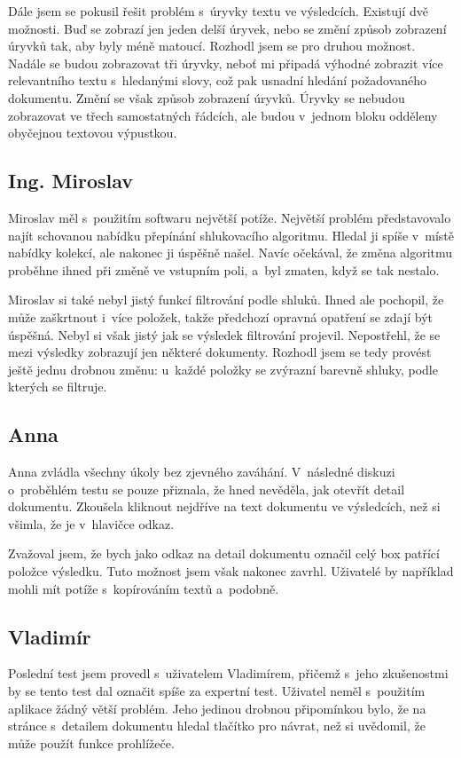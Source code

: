 Dále jsem se pokusil řešit problém s~úryvky textu ve výsledcích. Existují dvě možnosti. Buď se zobrazí jen jeden delší úryvek, nebo se změní způsob zobrazení úryvků tak, aby byly méně matoucí. Rozhodl jsem se pro druhou možnost. Nadále se budou zobrazovat tři úryvky, neboť mi připadá výhodné zobrazit více relevantního textu s~hledanými slovy, což pak usnadní hledání požadovaného dokumentu. Změní se však způsob zobrazení úryvků. Úryvky se nebudou zobrazovat ve třech samostatných řádcích, ale budou v~jednom bloku odděleny obyčejnou textovou výpustkou.

\subsection{Ing. Miroslav}
Miroslav měl s~použitím softwaru největší potíže. Největší problém představovalo najít schovanou nabídku přepínání shlukovacího algoritmu. Hledal ji spíše v~místě nabídky kolekcí, ale nakonec ji úspěšně našel. Navíc očekával, že změna algoritmu proběhne ihned při změně ve vstupním poli, a~byl zmaten, když se tak nestalo.

Miroslav si také nebyl jistý funkcí filtrování podle shluků. Ihned ale pochopil, že může zaškrtnout i~více položek, takže předchozí opravná opatření se zdají být úspěšná. Nebyl si však jistý jak se výsledek filtrování projevil. Nepostřehl, že se mezi výsledky zobrazují jen některé dokumenty. Rozhodl jsem se tedy provést ještě jednu drobnou změnu: u~každé položky se zvýrazní barevně shluky, podle kterých se filtruje.

\subsection{Anna}
Anna zvládla všechny úkoly bez zjevného zaváhání. V~následné diskuzi o~proběhlém testu se pouze přiznala, že hned nevěděla, jak otevřít detail dokumentu. Zkoušela kliknout nejdříve na text dokumentu ve výsledcích, než si všimla, že je v~hlavičce odkaz.

Zvažoval jsem, že bych jako odkaz na detail dokumentu označil celý box patřící položce výsledku. Tuto možnost jsem však nakonec zavrhl. Uživatelé by například mohli mít potíže s~kopírováním textů a~podobně.

\subsection{Vladimír}
Poslední test jsem provedl s~uživatelem Vladimírem, přičemž s~jeho zkušenostmi by se tento test dal označit spíše za expertní test. Uživatel neměl s~použitím aplikace žádný větší problém. Jeho jedinou drobnou připomínkou bylo, že na stránce s~detailem dokumentu hledal tlačítko pro návrat, než si uvědomil, že může použít funkce prohlížeče.

